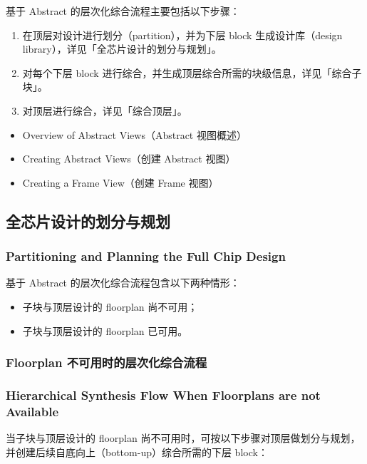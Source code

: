 基于 Abstract 的层次化综合流程主要包括以下步骤：
\begin{enumerate}
  \item 在顶层对设计进行划分（partition），并为下层 block 生成设计库（design library），详见「全芯片设计的划分与规划」。
  \item 对每个下层 block 进行综合，并生成顶层综合所需的块级信息，详见「综合子块」。
  \item 对顶层进行综合，详见「综合顶层」。
\end{enumerate}

\begin{seeAlsoBox}
\begin{itemize}
  \item Overview of Abstract Views（Abstract 视图概述）
  \item Creating Abstract Views（创建 Abstract 视图）
  \item Creating a Frame View（创建 Frame 视图）
\end{itemize}
\end{seeAlsoBox}

\subsection{全芯片设计的划分与规划}
\subsubsection*{Partitioning and Planning the Full Chip Design}

基于 Abstract 的层次化综合流程包含以下两种情形：
\begin{itemize}
  \item 子块与顶层设计的 floorplan 尚不可用；
  \item 子块与顶层设计的 floorplan 已可用。
\end{itemize}

\subsubsection{Floorplan 不可用时的层次化综合流程}
\subsubsection*{Hierarchical Synthesis Flow When Floorplans are not Available}

当子块与顶层设计的 floorplan 尚不可用时，可按以下步骤对顶层做划分与规划，并创建后续自底向上（bottom-up）综合所需的下层 block：

